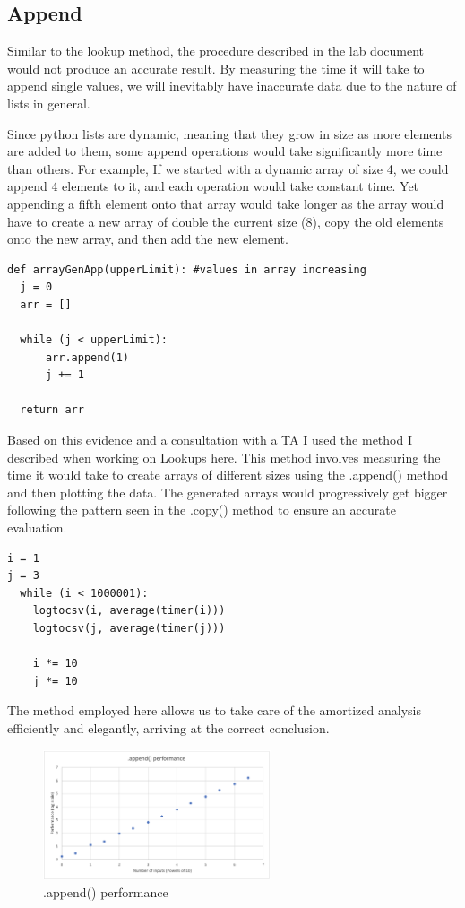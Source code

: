 \documentclass[12pt]{article}
\begin{document}
\subsection{Append}

Similar to the lookup method, the procedure described in the lab document would not produce an accurate result. By measuring the time it will take to append single values, we will inevitably have inaccurate data due to the nature of lists in general. 

Since python lists are dynamic, meaning that they grow in size as more elements are added to them, some append operations would take significantly more time than others. For example, If we started with a dynamic array of size 4, we could append 4 elements to it, and each operation would take constant time. Yet appending a fifth element onto that array would take longer as the array would have to create a new array of double the current size (8), copy the old elements onto the new array, and then add the new element. 

\footnotesize
\begin{verbatim}
def arrayGenApp(upperLimit): #values in array increasing
  j = 0
  arr = []
  
  while (j < upperLimit):
      arr.append(1)
      j += 1

  return arr
\end{verbatim}
\normalsize

Based on this evidence and a consultation with a TA I used the method I described when working on Lookups here. This method involves measuring the time it would take to create arrays of different sizes using the .append() method and then plotting the data. The generated arrays would progressively get bigger following the pattern seen in the .copy() method to ensure an accurate evaluation.

\footnotesize
\begin{verbatim}
i = 1
j = 3
  while (i < 1000001):
    logtocsv(i, average(timer(i)))
    logtocsv(j, average(timer(j)))
    
    i *= 10
    j *= 10
\end{verbatim}
\normalsize

The method employed here allows us to take care of the amortized analysis efficiently and elegantly, arriving at the correct conclusion. 

\begin{figure}[H]
\centering
\includegraphics[width=0.6\textwidth,height=\textheight,keepaspectratio]{appendgraph.png}
\caption{.append() performance}
\label{Figure: appendgraph}
\end{figure}
\end{document}
